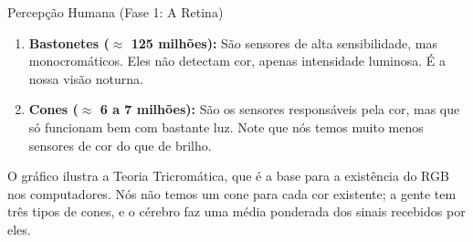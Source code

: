 \begin{frame}{Percepção Humana (Fase 1: A Retina)}
{        \begin{enumerate}
            \item \textbf{Bastonetes ($\approx$ 125 milhões):} São sensores de alta sensibilidade, mas monocromáticos. Eles não detectam cor, apenas intensidade luminosa. É a nossa visão noturna.
            
            \item \textbf{Cones ($\approx$ 6 a 7 milhões):} São os sensores responsáveis pela cor, mas que só funcionam bem com bastante luz. Note que nós temos muito menos sensores de cor do que de brilho.
        \end{enumerate}
        
        O gráfico ilustra a Teoria Tricromática, que é a base para a existência do RGB nos computadores. Nós não temos um cone para cada cor existente; a gente tem três tipos de cones, e o cérebro faz uma média ponderada dos sinais recebidos por eles.
    }
\end{frame}

